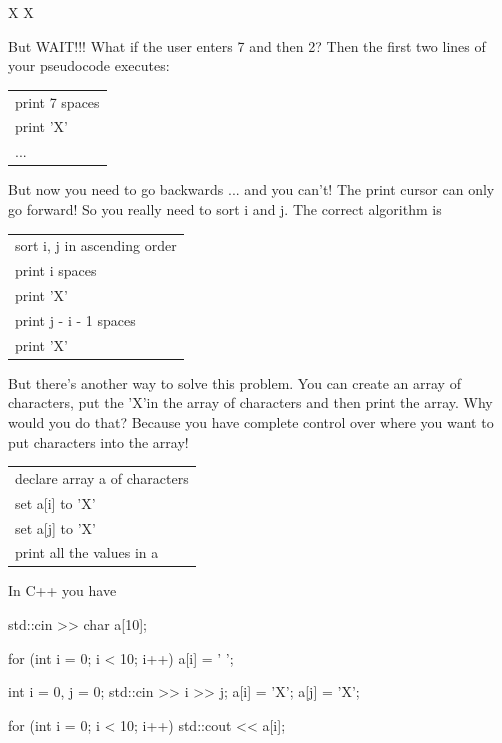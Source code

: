 \begin{consolethree}[escapeinside=||]
 X        X 
\end{consolethree}

But WAIT!!! What if the user enters 7 and then 2? Then the first two lines of your pseudocode executes:\\

\begin{tabular}{l}
print 7 spaces\\
print 'X'\\
...\\
\end{tabular}

But now you need to go backwards ... and you can't! The print cursor can only go forward! So you really need to sort i and j. The correct algorithm is\\

\begin{tabular}{l}
sort i, j in ascending order\\
print i spaces\\
print 'X'\\
print j - i - 1 spaces\\
print 'X'\\
\end{tabular}

But there's another way to solve this problem. You can create an array of characters, put the 'X'in the array of characters and then print the array. Why would you do that? Because you have complete control over where you want to put characters into the array!

\begin{tabular}{l}\\
declare array a of characters\\
set a[i] to 'X'\\
set a[j] to 'X'\\
print all the values in a\\
\end{tabular}

In C++ you have

\begin{consolethree}[escapeinside=||]
std::cin >> char a[10];

for (int i = 0; i < 10; i++)
{
    a[i] = ' ';
}

int i = 0, j = 0;
std::cin >> i >> j;
a[i] = 'X';
a[j] = 'X';

for (int i = 0; i < 10; i++)
{
    std::cout << a[i];
} 
\end{consolethree}


